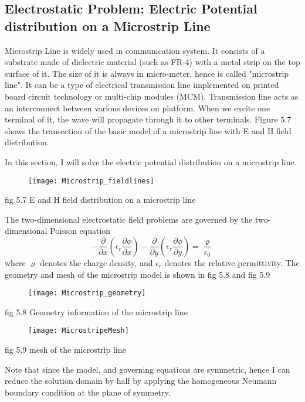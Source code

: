 \documentclass[journal]{IEEEtran}
\begin{document}
\subsection{Electrostatic Problem:  Electric Potential distribution on a Microstrip Line}
Microstrip Line is widely used in communication system. It consists of a substrate made of dielectric material (such as FR-4) with a metal strip on the top surface of it. The size of it is always in micro-meter, hence is called "microstrip line". It can be a type of electrical transmission line implemented on printed board circuit technology or multi-chip modules (MCM). Transmission line acts as an interconnect between various devices on platform. When we excite one terminal of it, the wave will propagate through it to other terminals. Figure 5.7 shows the transection of the basic model of a microstrip line with E and H field distribution.

In this section, I will solve the electric potential distribution on a microstrip line.
\begin{figure}[h]
	\centering
	\texttt{[image: Microstrip\_fieldlines]}
\end{figure}
\begin{center}
	\small fig 5.7 E and H field distribution on a microstrip line 
\end{center} 
The two-dimensional electrostatic field problems are governed by the two-dimensional Poisson equation
\begin{equation}
-\frac{\partial}{\partial x}(\epsilon_r\frac{\partial \phi}{\partial x})-\frac{\partial}{\partial y}(\epsilon_r\frac{\partial \phi}{\partial y}) = \frac{\varrho}{\epsilon_0}
\end{equation}
where $\varrho$ denotes the charge density, and $\epsilon_r$ denotes the relative permittivity. The geometry and mesh of the microstrip model is shown in fig 5.8 and fig 5.9
\begin{figure}[h]
	\centering
	\texttt{[image: Microstrip\_geometry]}
\end{figure}
\begin{center}
	\small fig 5.8 Geometry information of the microstrip line 
\end{center} 
\begin{figure}[h]
	\centering
	\texttt{[image: MicrostripeMesh]}
\end{figure}
\begin{center}
	\small fig 5.9 mesh of the microstrip line
\end{center} 
Note that since the model, and  governing equations are symmetric, hence I can reduce the solution domain by half by applying the homogeneous Neumann boundary condition at the plane of symmetry.
\end{document}
